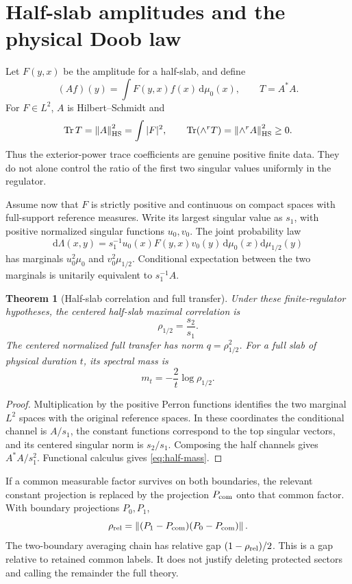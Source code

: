 \documentclass[11pt,oneside,openany]{book}
\newtheorem{theorem}{Theorem}[chapter]
\theoremstyle{definition}
\theoremstyle{remark}
\newcommand{\dd}{\mathrm d}
\newcommand{\Tr}{\operatorname{Tr}}
\newcommand{\norm}[1]{\left\lVert#1\right\rVert}
\begin{document}
\section{Half-slab amplitudes and the physical Doob law}
Let $F(y,x)$ be the amplitude for a half-slab, and define
\[
(Af)(y)=\int F(y,x)f(x)\,\dd\mu_0(x),\qquad T=A^*A.
\]
For $F\in L^2$, $A$ is Hilbert--Schmidt and
\begin{equation}\label{eq:HS}
\Tr T=\norm{A}_{\rm HS}^2=\int|F|^2,\qquad
\Tr(\wedge^rT)=\norm{\wedge^rA}_{\rm HS}^2\ge0.
\end{equation}
Thus the exterior-power trace coefficients are genuine positive finite data. They do not alone control the ratio of the first two singular values uniformly in the regulator.

Assume now that $F$ is strictly positive and continuous on compact spaces with full-support reference measures. Write its largest singular value as $s_1$, with positive normalized singular functions $u_0,v_0$. The joint probability law
\begin{equation}\label{eq:half-law}
\dd\Lambda(x,y)=s_1^{-1}u_0(x)F(y,x)v_0(y)
\,\dd\mu_0(x)\dd\mu_{1/2}(y)
\end{equation}
has marginals $u_0^2\mu_0$ and $v_0^2\mu_{1/2}$. Conditional expectation between the two marginals is unitarily equivalent to $s_1^{-1}A$.

\begin{theorem}[Half-slab correlation and full transfer]\label{thm:half}
Under these finite-regulator hypotheses, the centered half-slab maximal correlation is
\[
\rho_{1/2}=\frac{s_2}{s_1}.
\]
The centered normalized full transfer has norm $q=\rho_{1/2}^2$. For a full slab of physical duration $t$, its spectral mass is
\begin{equation}\label{eq:half-mass}
m_t=-\frac{2}{t}\log\rho_{1/2}.
\end{equation}
\end{theorem}
\begin{proof}
Multiplication by the positive Perron functions identifies the two marginal $L^2$ spaces with the original reference spaces. In these coordinates the conditional channel is $A/s_1$, the constant functions correspond to the top singular vectors, and its centered singular norm is $s_2/s_1$. Composing the half channels gives $A^*A/s_1^2$. Functional calculus gives \cref{eq:half-mass}.
\end{proof}

If a common measurable factor survives on both boundaries, the relevant constant projection is replaced by the projection $P_{\rm com}$ onto that common factor. With boundary projections $P_0,P_1$,
\[
\rho_{\rm rel}=\norm{(P_1-P_{\rm com})(P_0-P_{\rm com})}.
\]
The two-boundary averaging chain has relative gap $(1-\rho_{\rm rel})/2$. This is a gap relative to retained common labels. It does not justify deleting protected sectors and calling the remainder the full theory.
\end{document}
